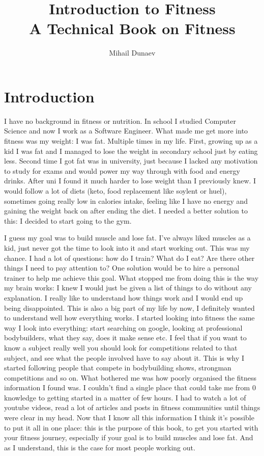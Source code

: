 \documentclass[openany, 12pt]{book}
\title{
  Introduction to Fitness \\
  \vskip 0.5cm
  \small A Technical Book on Fitness}
\author{Mihail Dunaev}
\date{}
\begin{document}
  \maketitle
  \tableofcontents

  \chapter{Introduction}
  
	I have no background in fitness or nutrition. In school I studied Computer Science and now I work as a Software Engineer. What made me get more 
	into fitness was my weight: I was fat. Multiple times in my life. First, growing up as a kid I was fat and I managed to lose the weight in 
	secondary school just by eating less. Second time I got fat was in university, just because I lacked any motivation to study for exams and would
	power my way through with food and energy drinks. After uni I found it much harder to lose weight than I previously knew. I would follow a lot  of diets (keto,
        food replacement like soylent or huel), sometimes going really low in calories intake, feeling like I 
	have no energy and gaining the weight back on after ending the diet. I needed a better solution to this: I decided to start going to the gym.
	
	I guess my goal was to build muscle and lose fat. I've always liked muscles as a kid, just never got the time to look into it and start
	working out. This was my chance. I had a lot of questions: how do I train? What do I eat? Are there other things I need to pay attention to?
	One solution would be to hire a personal trainer to help me achieve this goal. What stopped me from doing this is the way my brain works: I knew
	I would just be given a list of things to do without any explanation. I really like to understand how things work and I would end up being 
	disappointed. This is also a big part of my life by now, I definitely wanted to understand well how everything works. I started looking into fitness
	the same way I look into everything: start searching on google, looking at professional bodybuilders, what they say, does it make sense etc. 
	I feel that if you want to know a subject really well you should look for competitions related to that subject, and see what the people involved
	have to say about it. This is why I started following people that compete in bodybuilding shows, strongman competitions and so on. 	
	What bothered me was how poorly organised the fitness information I found was. I couldn't find a single place that could take me from 0 knowledge
	to getting started in a matter of few hours. I had to watch a lot of youtube videos, read a lot of articles and posts in fitness communities until
	things were clear in my head. Now that I know all this information I think it's possible to put it all in one place: this is the purpose of this 
	book, to get you started with your fitness journey, especially if your goal is to build muscles and lose fat. And as I understand, this is the case
	for	most people working out.
	
\end{document}
